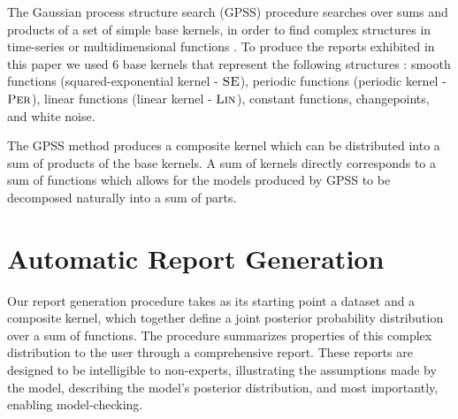 \documentclass{article} %
\begin{document}
The Gaussian process structure search (GPSS) procedure searches over sums and products of a set of simple base kernels, in order to find complex structures in time-series or multidimensional functions \cite{DuvLloGroetal13}.
To produce the reports exhibited in this paper we used 6 base kernels that represent the following structures : smooth functions (squared-exponential kernel - ${\textsc{SE}}$), periodic functions (periodic kernel - ${\textsc{Per}}$), linear functions (linear kernel - ${\textsc{Lin}}$), constant functions, changepoints, and white noise.
%

The GPSS method produces a composite kernel which can be distributed into a sum of products of the base kernels.
A sum of kernels directly corresponds to a sum of functions which allows for the models produced by GPSS to be decomposed naturally into a sum of parts.



\section{Automatic Report Generation}
\label{sec:method}

Our report generation procedure takes as its starting point a dataset and a composite kernel, which together define a joint posterior probability distribution over a sum of functions.
The procedure summarizes properties of this complex distribution to the user through a comprehensive report.
%
These reports are designed to be intelligible to non-experts, illustrating the assumptions made by the model, describing the model's posterior distribution, and most importantly, enabling model-checking.

\end{document}
